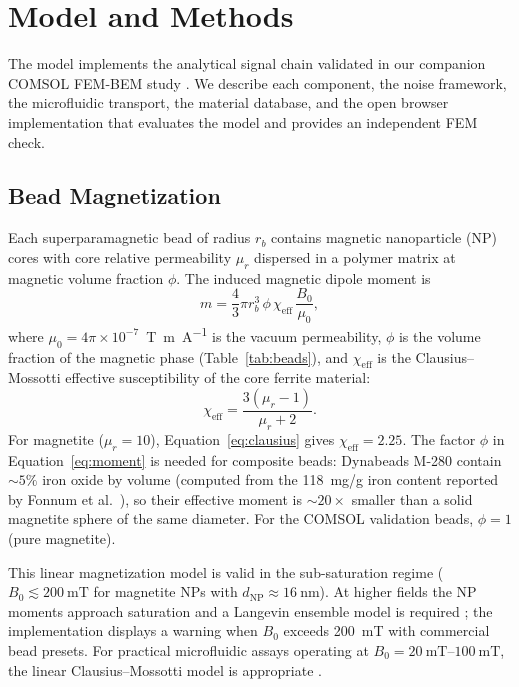 \documentclass[biosensors,article,submit,pdftex,moreauthors]{Definitions/mdpi}
\begin{document}
\section{Model and Methods}
\label{sec:model}

The model implements the analytical signal chain validated in our companion
COMSOL FEM-BEM study \cite{govindaraju2025}. We describe each component, the noise
framework, the microfluidic transport, the material database, and the open browser
implementation that evaluates the model and provides an independent FEM check.

\subsection{Bead Magnetization}
\label{sec:magnetization}

Each superparamagnetic bead of radius $r_b$ contains magnetic nanoparticle (NP)
cores with core relative permeability $\mu_r$ dispersed in a polymer matrix at
magnetic volume fraction $\phi$. The induced magnetic dipole moment is
\begin{equation}
m = \frac{4}{3}\pi r_b^3 \, \phi \, \chi_{\text{eff}} \, \frac{B_0}{\mu_0},
\label{eq:moment}
\end{equation}
where $\mu_0 = 4\pi \times 10^{-7}$~\si{\tesla\meter\per\ampere} is the vacuum
permeability, $\phi$ is the volume fraction of the magnetic phase
(Table~\ref{tab:beads}), and $\chi_{\text{eff}}$ is the Clausius--Mossotti effective
susceptibility of the core ferrite material:
\begin{equation}
\chi_{\text{eff}} = \frac{3(\mu_r - 1)}{\mu_r + 2}.
\label{eq:clausius}
\end{equation}
For magnetite ($\mu_r = 10$), Equation~\eqref{eq:clausius} gives
$\chi_{\text{eff}} = 2.25$. The factor $\phi$ in Equation~\eqref{eq:moment} is
needed for composite beads: Dynabeads M-280 contain ${\sim}5\%$ iron oxide by
volume (computed from the \SI{118}{mg/g} iron content reported by Fonnum et al.\
\cite{fonnum2005}), so their effective moment is ${\sim}20\times$ smaller than a
solid magnetite sphere of the same diameter. For the COMSOL validation beads,
$\phi = 1$ (pure magnetite).

This linear magnetization model is valid in the sub-saturation regime
($B_0 \lesssim \SI{200}{\milli\tesla}$ for magnetite NPs with
$d_\text{NP} \approx \SI{16}{\nano\meter}$). At higher fields the NP moments
approach saturation and a Langevin ensemble model is required
\cite{elfimova2019,henrard2019}; the implementation displays a warning when
$B_0$ exceeds \SI{200}{\milli\tesla} with commercial bead presets. For practical
microfluidic assays operating at $B_0 = \SIrange{20}{100}{\milli\tesla}$, the
linear Clausius--Mossotti model is appropriate \cite{ota2019}.
\end{document}
